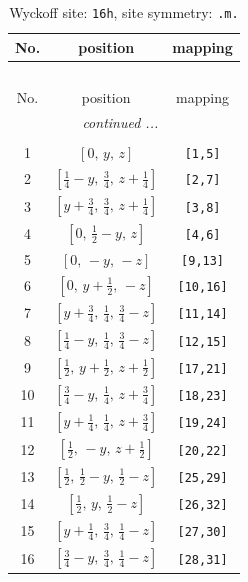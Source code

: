 \documentclass[fleqn,8pt]{jsarticle}
\begin{document}
\renewcommand{\arraystretch}{1.2}
\begin{longtable}{ccc}
\caption{Wyckoff site: {\tt 16h}, site symmetry: {\tt .m.}}
 \\
 \hline \hline
No. & position & mapping \\ \hline \endfirsthead

\multicolumn{2}{l}{\tablename\ \thetable{}} \\
 \hline \hline
No. & position & mapping \\ \hline \endhead

 \hline \hline
\multicolumn{2}{r}{\footnotesize\it continued ...} \\ \endfoot

 \hline \hline
\multicolumn{2}{r}{} \\ \endlastfoot

1 & $\left[ 0,\, y,\, z \right]$ & {\tt [1,5]} \\ \hline
2 & $\left[ \frac{1}{4} - y,\, \frac{3}{4},\, z + \frac{1}{4} \right]$ & {\tt [2,7]} \\ \hline
3 & $\left[ y + \frac{3}{4},\, \frac{3}{4},\, z + \frac{1}{4} \right]$ & {\tt [3,8]} \\ \hline
4 & $\left[ 0,\, \frac{1}{2} - y,\, z \right]$ & {\tt [4,6]} \\ \hline
5 & $\left[ 0,\, - y,\, - z \right]$ & {\tt [9,13]} \\ \hline
6 & $\left[ 0,\, y + \frac{1}{2},\, - z \right]$ & {\tt [10,16]} \\ \hline
7 & $\left[ y + \frac{3}{4},\, \frac{1}{4},\, \frac{3}{4} - z \right]$ & {\tt [11,14]} \\ \hline
8 & $\left[ \frac{1}{4} - y,\, \frac{1}{4},\, \frac{3}{4} - z \right]$ & {\tt [12,15]} \\ \hline
9 & $\left[ \frac{1}{2},\, y + \frac{1}{2},\, z + \frac{1}{2} \right]$ & {\tt [17,21]} \\ \hline
10 & $\left[ \frac{3}{4} - y,\, \frac{1}{4},\, z + \frac{3}{4} \right]$ & {\tt [18,23]} \\ \hline
11 & $\left[ y + \frac{1}{4},\, \frac{1}{4},\, z + \frac{3}{4} \right]$ & {\tt [19,24]} \\ \hline
12 & $\left[ \frac{1}{2},\, - y,\, z + \frac{1}{2} \right]$ & {\tt [20,22]} \\ \hline
13 & $\left[ \frac{1}{2},\, \frac{1}{2} - y,\, \frac{1}{2} - z \right]$ & {\tt [25,29]} \\ \hline
14 & $\left[ \frac{1}{2},\, y,\, \frac{1}{2} - z \right]$ & {\tt [26,32]} \\ \hline
15 & $\left[ y + \frac{1}{4},\, \frac{3}{4},\, \frac{1}{4} - z \right]$ & {\tt [27,30]} \\ \hline
16 & $\left[ \frac{3}{4} - y,\, \frac{3}{4},\, \frac{1}{4} - z \right]$ & {\tt [28,31]} \\
\end{longtable}
\end{document}
